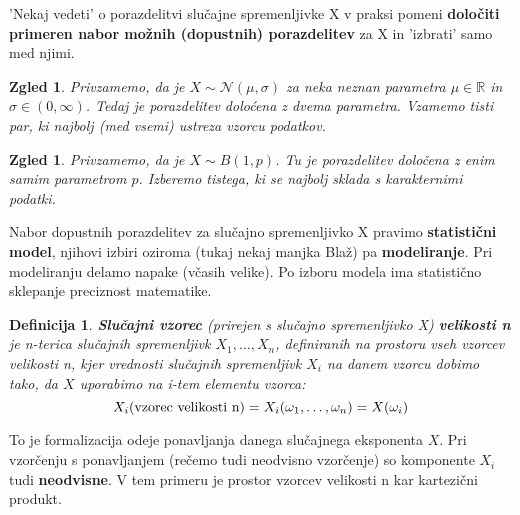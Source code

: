 \documentclass[11pt]{article}
\newtheorem{Definicija}[Izrek]{{\sc Definicija}}
\newtheorem{Zgled}[Izrek]{{\sc Zgled}}
\begin{document}
'Nekaj vedeti' o porazdelitvi slučajne spremenljivke X v praksi pomeni \textbf{določiti primeren nabor možnih (dopustnih) porazdelitev} za X in 'izbrati' samo med njimi.
\begin{Zgled}
	Privzamemo, da je $X\sim \mathcal{N}(\mu, \sigma)$ za neka neznan parametra  $\mu \in \mathbb{R}$ in $\sigma\in(0, \infty)$. Tedaj je porazdelitev doloćena z dvema parametra. Vzamemo tisti par, ki najbolj (med vsemi) ustreza vzorcu podatkov.
\end{Zgled}		
\begin{Zgled}
	Privzamemo, da je $X\sim B(1,p)$. Tu je porazdelitev določena  z enim samim parametrom $p$. Izberemo tistega, ki se najbolj sklada s karakternimi podatki.
\end{Zgled}

Nabor dopustnih porazdelitev za slučajno spremenljivko X pravimo \textbf{statistični model}, njihovi izbiri oziroma (tukaj nekaj manjka Blaž) pa \textbf{modeliranje}. Pri modeliranju delamo napake (včasih velike). Po izboru modela ima statistično sklepanje preciznost matematike.
\begin{Definicija}
	\textbf{Slučajni vzorec} (prirejen s slučajno spremenljivko X) \textbf{velikosti n} je n-terica slučajnih spremenljivk $X_1, \ldots, X_n$, definiranih na prostoru vseh vzorcev velikosti n, kjer vrednosti slučajnih spremenljivk $X_i$ na danem vzorcu dobimo tako, da $X$ uporabimo na i-tem elementu vzorca:
	$$X_i(\textnormal{vzorec velikosti n}) = X_i(\omega_1, \ldots,\omega_n) = X(\omega_i)$$
\end{Definicija}
To je formalizacija odeje ponavljanja danega slučajnega eksponenta $X$. Pri vzorčenju s ponavljanjem (rečemo tudi neodvisno vzorčenje) so komponente $X_i$ tudi \textbf{neodvisne}. V tem primeru je prostor vzorcev velikosti n kar kartezični produkt.
\end{document}
